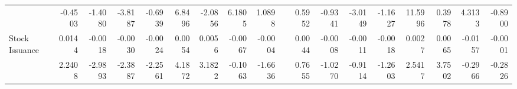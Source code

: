 \begin{table}[h]
{\begin{tabular}{lrrrrrrrrrrrrrrrrr}
& -0.4503 & -1.4080 & -3.8187 & -0.6939 & 6.8496 & -2.0856 & 6.1805 & 1.0898 &       & 0.5952 & -0.9341 & -3.0149 & -1.1627 & 11.5996 & 0.3978 & 4.3133 & -0.8900 \\
Stock Issuance & 0.0144 & -0.0018 & -0.0030 & -0.0024 & 0.0054 & 0.0056 & -0.0067 & -0.0004 &       & 0.0044 & -0.0008 & -0.0011 & -0.0018 & 0.0027 & 0.0065 & -0.0157 & -0.0001 \\
& 2.2408 & -2.9893 & -2.3887 & -2.2561 & 4.1872 & 3.1822 & -0.1063 & -1.6636 &       & 0.7655 & -1.0270 & -0.9114 & -1.2603 & 2.5417 & 3.7502 & -0.2966 & -0.2826 \\
\bottomrule
\end{tabular}%
}
\label{tab:epu-ff6v}%
\end{table}%
